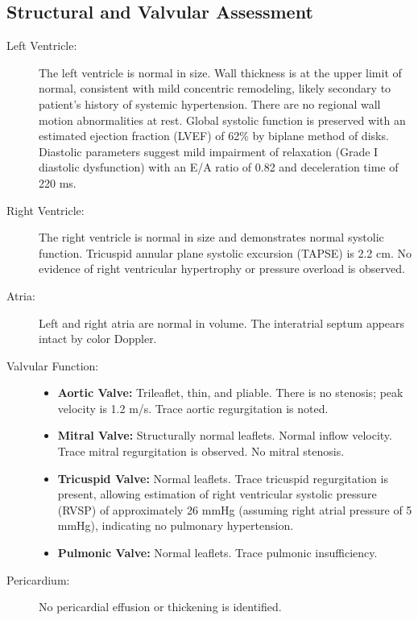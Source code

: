 \subsection{Structural and Valvular Assessment}
\begin{description}
    \item[Left Ventricle:] The left ventricle is normal in size. Wall thickness is at the upper limit of normal, consistent with mild concentric remodeling, likely secondary to patient's history of systemic hypertension. There are no regional wall motion abnormalities at rest. Global systolic function is preserved with an estimated ejection fraction (LVEF) of 62\% by biplane method of disks. Diastolic parameters suggest mild impairment of relaxation (Grade I diastolic dysfunction) with an E/A ratio of 0.82 and deceleration time of 220 ms.
    \item[Right Ventricle:] The right ventricle is normal in size and demonstrates normal systolic function. Tricuspid annular plane systolic excursion (TAPSE) is 2.2 cm. No evidence of right ventricular hypertrophy or pressure overload is observed.
    \item[Atria:] Left and right atria are normal in volume. The interatrial septum appears intact by color Doppler.
    \item[Valvular Function:] 
    \begin{itemize}
        \item \textbf{Aortic Valve:} Trileaflet, thin, and pliable. There is no stenosis; peak velocity is 1.2 m/s. Trace aortic regurgitation is noted.
        \item \textbf{Mitral Valve:} Structurally normal leaflets. Normal inflow velocity. Trace mitral regurgitation is observed. No mitral stenosis.
        \item \textbf{Tricuspid Valve:} Normal leaflets. Trace tricuspid regurgitation is present, allowing estimation of right ventricular systolic pressure (RVSP) of approximately 26 mmHg (assuming right atrial pressure of 5 mmHg), indicating no pulmonary hypertension.
        \item \textbf{Pulmonic Valve:} Normal leaflets. Trace pulmonic insufficiency.
    \end{itemize}
    \item[Pericardium:] No pericardial effusion or thickening is identified.
\end{description}
